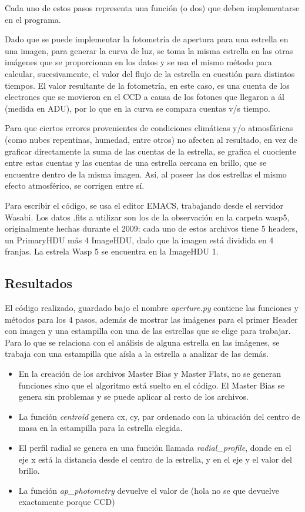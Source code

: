 \documentclass[a4paper, 11pt, spanish]{article}
\begin{document}
Cada uno de estos pasos representa una funci\'on (o dos) que deben implementarse en el programa.

Dado que se puede implementar la fotometr\'ia de apertura para una estrella en una imagen, para generar la curva de luz, se toma la misma estrella en las otras im\'agenes que se proporcionan en los datos y se usa el mismo m\'etodo para calcular, sucesivamente, el valor del flujo de la estrella en cuesti\'on para distintos tiempos. El valor resultante de la fotometr\'ia, en este caso, es una cuenta de los electrones que se movieron en el CCD a causa de los fotones que llegaron a \'al (medida en ADU), por lo que en la curva se compara cuentas v/s tiempo. 

Para que ciertos errores provenientes de condiciones clim\'aticas y/o atmosf\'aricas (como nubes repentinas, humedad, entre otros) no afecten al resultado, en vez de graficar directamente la suma de las cuentas de la estrella, se grafica el cuociente entre estas cuentas y las cuentas de una estrella cercana en brillo, que se encuentre dentro de la misma imagen. As\'i, al poseer las dos estrellas el mismo efecto atmosf\'erico, se corrigen entre s\'i.

Para escribir el c\'odigo, se usa el editor EMACS, trabajando desde el servidor Wasabi. Los datos .fits a utilizar son los de la observaci\'on en la carpeta wasp5, originalmente hechas durante el 2009: cada uno de estos archivos tiene 5 headers, un PrimaryHDU m\'as 4 ImageHDU, dado que la imagen est\'a dividida en 4 franjas. La estrela Wasp 5 se encuentra en la ImageHDU 1. 


\subsection{Resultados}

El c\'odigo realizado, guardado bajo el nombre  \textit{aperture.py} contiene las funciones y m\'etodos para los 4 pasos, adem\'as de mostrar las im\'agenes para el primer Header con imagen y una estampilla con una de las estrellas que se elige para trabajar. Para lo que se relaciona con el an\'alisis de alguna estrella en las im\'agenes, se trabaja con una estampilla que a\'isla a la estrella a analizar de las dem\'as.

\begin{itemize}
	\item En la creaci\'on de los archivos Master Bias y Master Flats, no se generan funciones sino que el algoritmo est\'a suelto en el c\'odigo. El Master Bias se genera sin problemas y se puede aplicar al resto de los archivos.
	\item La funci\'on \textit{centroid} genera cx, cy, par ordenado con la ubicaci\'on del centro de masa en la estampilla para la estrella elegida. 
	\item El perfil radial se genera en una funci\'on llamada \textit{radial\_profile}, donde en el eje x est\'a la distancia desde el centro de la estrella, y en el eje y el valor del brillo. 
	\item La funci\'on \textit{ap\_photometry} devuelve el valor de (hola no se que devuelve exactamente porque CCD)
\end{itemize}
\end{document}
